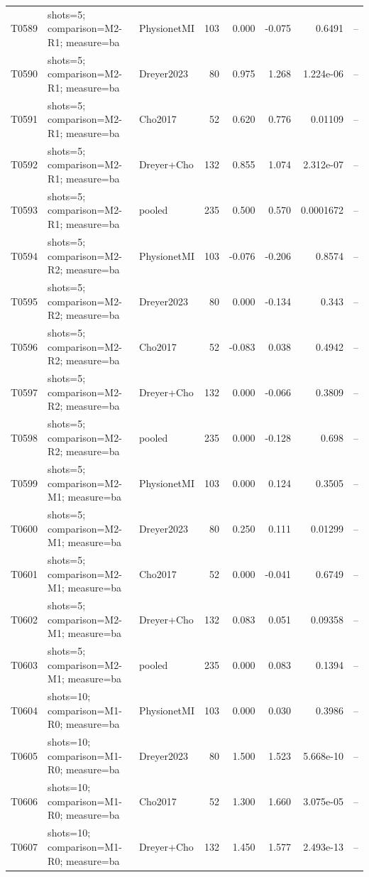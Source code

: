 \begin{longtable}{p{.45in}p{2.6in}p{.75in}rrrrr}
T0589 & shots=5; comparison=M2-R1; measure=ba & PhysionetMI & 103 & 0.000 & -0.075 & 0.6491 & -- \\
T0590 & shots=5; comparison=M2-R1; measure=ba & Dreyer2023 & 80 & 0.975 & 1.268 & 1.224e-06 & -- \\
T0591 & shots=5; comparison=M2-R1; measure=ba & Cho2017 & 52 & 0.620 & 0.776 & 0.01109 & -- \\
T0592 & shots=5; comparison=M2-R1; measure=ba & Dreyer+Cho & 132 & 0.855 & 1.074 & 2.312e-07 & -- \\
T0593 & shots=5; comparison=M2-R1; measure=ba & pooled & 235 & 0.500 & 0.570 & 0.0001672 & -- \\
T0594 & shots=5; comparison=M2-R2; measure=ba & PhysionetMI & 103 & -0.076 & -0.206 & 0.8574 & -- \\
T0595 & shots=5; comparison=M2-R2; measure=ba & Dreyer2023 & 80 & 0.000 & -0.134 & 0.343 & -- \\
T0596 & shots=5; comparison=M2-R2; measure=ba & Cho2017 & 52 & -0.083 & 0.038 & 0.4942 & -- \\
T0597 & shots=5; comparison=M2-R2; measure=ba & Dreyer+Cho & 132 & 0.000 & -0.066 & 0.3809 & -- \\
T0598 & shots=5; comparison=M2-R2; measure=ba & pooled & 235 & 0.000 & -0.128 & 0.698 & -- \\
T0599 & shots=5; comparison=M2-M1; measure=ba & PhysionetMI & 103 & 0.000 & 0.124 & 0.3505 & -- \\
T0600 & shots=5; comparison=M2-M1; measure=ba & Dreyer2023 & 80 & 0.250 & 0.111 & 0.01299 & -- \\
T0601 & shots=5; comparison=M2-M1; measure=ba & Cho2017 & 52 & 0.000 & -0.041 & 0.6749 & -- \\
T0602 & shots=5; comparison=M2-M1; measure=ba & Dreyer+Cho & 132 & 0.083 & 0.051 & 0.09358 & -- \\
T0603 & shots=5; comparison=M2-M1; measure=ba & pooled & 235 & 0.000 & 0.083 & 0.1394 & -- \\
T0604 & shots=10; comparison=M1-R0; measure=ba & PhysionetMI & 103 & 0.000 & 0.030 & 0.3986 & -- \\
T0605 & shots=10; comparison=M1-R0; measure=ba & Dreyer2023 & 80 & 1.500 & 1.523 & 5.668e-10 & -- \\
T0606 & shots=10; comparison=M1-R0; measure=ba & Cho2017 & 52 & 1.300 & 1.660 & 3.075e-05 & -- \\
T0607 & shots=10; comparison=M1-R0; measure=ba & Dreyer+Cho & 132 & 1.450 & 1.577 & 2.493e-13 & -- \\

\end{longtable}
